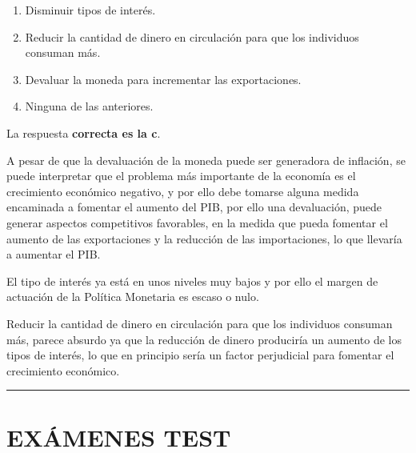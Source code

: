 \documentclass[
  letterpaper,
  DIV=11,
  numbers=noendperiod]{scrreprt}
\begin{document}
\begin{enumerate}
\def\labelenumi{\alph{enumi})}
\item
  Disminuir tipos de interés.
\item
  Reducir la cantidad de dinero en circulación para que los individuos
  consuman más.
\item
  Devaluar la moneda para incrementar las exportaciones.
\item
  Ninguna de las anteriores.
\end{enumerate}

\begin{tcolorbox}[enhanced jigsaw, opacityback=0, bottomrule=.15mm, colframe=quarto-callout-tip-color-frame, arc=.35mm, leftrule=.75mm, breakable, colback=white, rightrule=.15mm, toprule=.15mm, left=2mm]
\begin{minipage}[t]{5.5mm}
\textcolor{quarto-callout-tip-color}{\faLightbulb}
\end{minipage}%
\begin{minipage}[t]{\textwidth - 5.5mm}

La respuesta \textbf{correcta es la c}.

A pesar de que la devaluación de la moneda puede ser generadora de
inflación, se puede interpretar que el problema más importante de la
economía es el crecimiento económico negativo, y por ello debe tomarse
alguna medida encaminada a fomentar el aumento del PIB, por ello una
devaluación, puede generar aspectos competitivos favorables, en la
medida que pueda fomentar el aumento de las exportaciones y la reducción
de las importaciones, lo que llevaría a aumentar el PIB.

El tipo de interés ya está en unos niveles muy bajos y por ello el
margen de actuación de la Política Monetaria es escaso o nulo.

Reducir la cantidad de dinero en circulación para que los individuos
consuman más, parece absurdo ya que la reducción de dinero produciría un
aumento de los tipos de interés, lo que en principio sería un factor
perjudicial para fomentar el crecimiento económico.

\end{minipage}%
\end{tcolorbox}

\begin{center}\rule{0.5\linewidth}{0.5pt}\end{center}

\part{EXÁMENES TEST}
\end{document}

